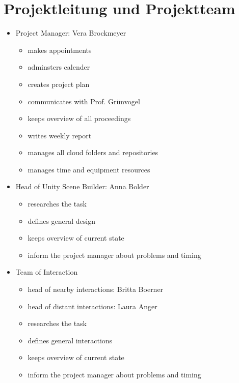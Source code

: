 \documentclass[a4paper, 12pt]{article}
\newcommand{\changefont}[3]{
\fontfamily{#1} \fontseries{#2} \fontshape{#3} \selectfont}
\begin{document}

%


\newpage

\section{Projektleitung und Projektteam}
\begin{itemize}
	\item Project Manager: Vera Brockmeyer
	\begin{itemize}
		\item makes appointments
		\item adminsters calender
		\item creates project plan
		\item communicates with Prof. Grünvogel
		\item keeps overview of all proceedings
		\item writes weekly report
		\item manages all cloud folders and repositories
		\item manages time and equipment resources 
		\end{itemize}
	\item Head of Unity Scene Builder: Anna Bolder
		\begin{itemize}
		\item researches the task
		\item defines general design
		\item keeps overview of current state
		\item inform the project manager about problems and timing
	\end{itemize} 
	\item Team of Interaction
		\begin{itemize}
		\item head  of nearby interactions: Britta Boerner
		\item head of distant interactions: Laura Anger
		\item researches the task
		\item defines general interactions
		\item keeps overview of current state
		\item inform the project manager about problems and timing
	\end{itemize} 
\end{itemize}
\end{document}
